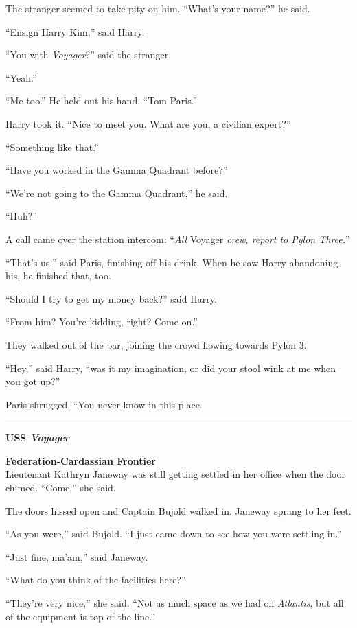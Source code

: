 \documentclass[twoside,letterpaper,12pt]{memoir}
\begin{document}
The stranger seemed to take pity on him. ``What's your name?'' he said.

``Ensign Harry Kim,'' said Harry.

``You with \textit{Voyager}?'' said the stranger.

``Yeah.''

``Me too.'' He held out his hand. ``Tom Paris.''

Harry took it. ``Nice to meet you. What are you, a civilian expert?''

``Something like that.''

``Have you worked in the Gamma Quadrant before?''

``We're not going to the Gamma Quadrant,'' he said.

``Huh?''

A call came over the station intercom: ``\textit{All} Voyager \textit{crew, report to Pylon Three.}''

``That's us,'' said Paris, finishing off his drink. When he saw Harry abandoning his, he finished that, too.

``Should I try to get my money back?'' said Harry.

``From him? You're kidding, right? Come on.''

They walked out of the bar, joining the crowd flowing towards Pylon 3.

``Hey,'' said Harry, ``was it my imagination, or did your stool wink at me when you got up?''

Paris shrugged. ``You never know in this place.


\fancybreak{\rule{3cm}{0.4 pt}}
\noindent\textbf{USS \textit{Voyager}}

\noindent\textbf{Federation-Cardassian Frontier}\\

Lieutenant Kathryn Janeway was still getting settled in her office when the door chimed. ``Come,'' she said.

The doors hissed open and Captain Bujold walked in. Janeway sprang to her feet.

``As you were,'' said Bujold. ``I just came down to see how you were settling in.''

``Just fine, ma'am,'' said Janeway.

``What do you think of the facilities here?''

``They're very nice,'' she said. ``Not as much space as we had on \textit{Atlantis}, but all of the equipment is top of the line.''
\end{document}
